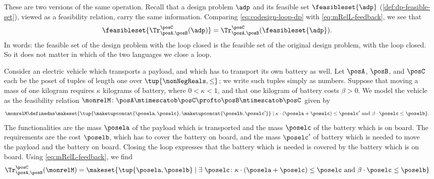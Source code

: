 These are two versions of the same operation.
Recall that a design problem $\adp$ and its feasible set $\feasibleset{\adp}$ (\cref{def:dp-feasible-set}), viewed as a feasibility relation, carry the same information.
Comparing \cref{eq:codesign-loop-dp} with \cref{eq:mRelL-feedback}, we see that
\begin{equation}
    \label{eq:codesign-loop-feasible-set}
    \feasibleset{\Tr_{\posA,\posB}^{\posC}(\adp)} = \Tr_{\posA,\posB}^{\posC}(\feasibleset{\adp}).
\end{equation}
In words: the feasible set of the design problem with the loop closed is the feasible set of the original design problem, with the loop closed.
So it does not matter in which of the two languages we close a loop.

\begin{example}
    \label{exa:codesign-feedback-vehicle}
    Consider an electric vehicle which transports a payload, and which has to transport its own battery as well.
    Let $\posA$, $\posB$, and $\posC$ each be the poset of tuples of length one over $\tup{\nonNegReals, \leq}$; we write such tuples simply as numbers.
    Suppose that moving a mass of one kilogram requires $\kappa$ kilograms of battery, where $0 < \kappa < 1$, and that one kilogram of battery costs $\beta > 0$.
    We model the vehicle as the feasibility relation $\monrelM \colon \posA \mtimescatob \posC \profto \posB \mtimescatob \posC$ given by
    \begin{equation}
        \label{eq:codesign-vehicle}
        \monrelM \definedas \makeset{ \tup{\maketupconcat{\posela, \poselc}, \maketupconcat{\poselb, \poselc'}} \mid \kappa \cdot (\posela + \poselc) \leq \poselc' \text{ and } \beta \cdot \poselc \leq \poselb }.
    \end{equation}
    The functionalities are the mass $\posela$ of the payload which is transported and the mass $\poselc$ of the battery which is on board.
    The requirements are the cost $\poselb$, which has to cover the battery on board, and the mass $\poselc'$ of battery which is needed to move the payload and the battery on board.
    Closing the loop expresses that the battery which is needed is covered by the battery which is on board.
    Using \cref{eq:mRelL-feedback}, we find
    \begin{equation}
        \label{eq:codesign-vehicle-loop}
        \begin{aligned}
            \Tr_{\posA,\posB}^{\posC}(\monrelM)
             & = \makeset{ \tup{\posela, \poselb} \mid \exists \ \poselc \colon \kappa \cdot (\posela + \poselc) \leq \poselc \text{ and } \beta \cdot \poselc \leq \poselb } \\

\end{aligned}
\end{equation}
\end{example}

